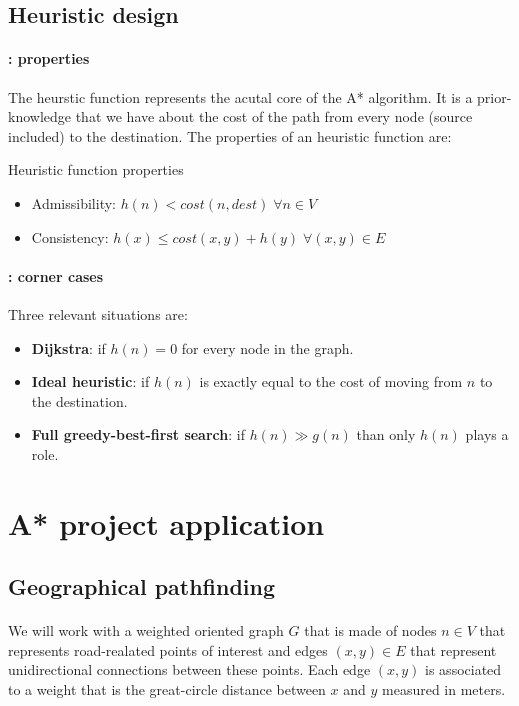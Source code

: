 \documentclass[12pt]{beamer}
\begin{document}
	\subsection{Heuristic design}
	\begin{frame}{\secname}
		\framesubtitle{\subsecname: properties}
		The heurstic function represents the acutal core of the A* algorithm. It is a prior-knowledge that
		we have about the cost of the path from every node (source included) to the destination. The properties
		of an heuristic function are:
		\begin{block}{Heuristic function properties}
			\begin{itemize}
			\item 	Admissibility: $h(n) < cost(n, dest) \;\forall n \in V$
			\item 	Consistency: $h(x) \le cost(x, y) + h(y) \; \forall (x, y) \in E$  
			\end{itemize}
		\end{block}
	\end{frame}
	\begin{frame}{\secname}
		\framesubtitle{\subsecname: corner cases}
		Three relevant situations are:
		\begin{itemize}
			\item \textbf{Dijkstra}: if $h(n)=0$ for every node in the graph.
			\item \textbf{Ideal heuristic}: if $h(n)$ is exactly equal to the cost of moving from $n$ to
				  the destination.
			\item \textbf{Full greedy-best-first search}: if $h(n) \gg g(n)$ than only $h(n)$ plays a role.
		\end{itemize}
	\end{frame}
	\section{A* project application}
	\subsection{Geographical pathfinding}
	\begin{frame}{\secname}
		\framesubtitle{\subsecname}
		We will work with a weighted oriented graph $G$ that is made of nodes $n \in V$ that represents
		road-realated points of interest and edges $(x,y) \in E$ that represent unidirectional connections between these points.
		Each edge $(x, y)$ is associated to a weight that is the great-circle distance between $x$ and $y$ measured
		in meters.
	\end{frame}
\end{document}
